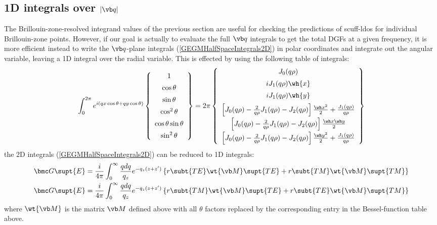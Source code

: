 \documentclass[letterpaper]{article}
\begin{document}
\subsection{1D integrals over $|\vb q|$}

The Brillouin-zone-resolved integrand values of the 
previous section are useful for checking the 
predictions of {\sc scuff-ldos} for individual 
Brillouin-zone points. However, if our goal is actually
to evaluate the full $\vb q$ integrals to get the
total DGFs at a given frequency, it is more efficient
instead to write the $\vb q$-plane integrals
(\ref{GEGMHalfSpaceIntegrals2D})
in polar coordinates and integrate out the angular
variable, leaving a 1D integral over the radial variable.
This is effected by using the following table of integrals:
$$
 \int_0^{2\pi} e^{i(qx\cos\theta  + qy\cos\theta)} 
 \left\{\begin{array}{c}
 1 \\[5pt]
 \cos\theta \\[5pt]
 \sin\theta \\[5pt]
 \cos^2\theta \\[5pt]
 \cos\theta \sin\theta \\[5pt]
 \sin^2\theta \\
 \end{array}\right\}
= 2\pi \left\{ \begin{array}{c}
    J_0 (q\rho)         \\[5pt]
    i J_1(q\rho) \wh{x} \\[5pt]
    i J_1(q\rho) \wh{y} \\[5pt]
    \left[J_0(q\rho) - \frac{2}{q\rho} J_1(q\rho) - J_2(q\rho)\right]\frac{\wh x^2}{2} 
    + \frac{J_1(q\rho)}{q\rho} \\[5pt]
    \left[J_0(q\rho) - \frac{2}{q\rho} J_1(q\rho) - J_2(q\rho)\right]\frac{\wh x \wh y}{2}
    \\[5pt]
    \left[J_0(q\rho) - \frac{2}{q\rho} J_1(q\rho) - J_2(q\rho)\right]\frac{\wh y^2}{2} 
    + \frac{J_1(q\rho)}{q\rho}
  \end{array}\right\}
$$
the 2D integrals (\ref{GEGMHalfSpaceIntegrals2D}) can be reduced to 1D integrals:
\begin{align}
 \bmc G\supt{E}
&=\frac{i}{4\pi} \int_0^\infty \frac{qdq}{q_z} e^{-q_z(z+z^\prime)}
  \left\{ r\subt{TE} \wt{\vb M}\supt{TE}
         +r\subt{TM} \wt{\vb M}\supt{TM}
  \right\}
\\
 \bmc G\supt{E}
&=\frac{i}{4\pi} \int_0^\infty \frac{qdq}{q_z} e^{-q_z(z+z^\prime)}
  \left\{ r\subt{TM} \wt{\vb M}\supt{TE}
         +r\subt{TE} \wt{\vb M}\supt{TM}
  \right\}
\end{align}
where $\wt{\vb M}$ is the matrix $\vb M$ defined above
with all $\theta$ factors replaced by the corresponding
entry in the Bessel-function table above.
\end{document}

